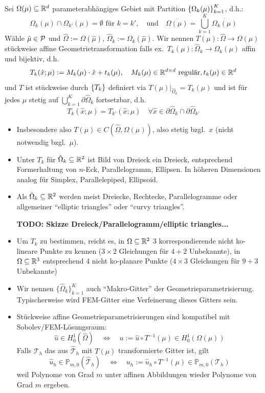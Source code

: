 \begin{defn}
	Sei $\Omega(\mu) \subseteq \mathbb{R}^d$ parameterabhängiges Gebiet mit Partition $\left\{\Omega_k(\mu)\right\}_{k=1}^K$, d.h.:
	\[
		\Omega_k(\mu) \cap \Omega_{k'}(\mu) = \emptyset \text{ für } k = k', \quad \text{und} \quad \overline{\Omega(\mu)} = \bigcup_{k=1}^{K} \overline{\Omega_k(\mu)}
	\]
	Wähle $\hat\mu \in \mathcal{P}$ und $\hat \Omega := \Omega(\hat\mu)$, $\hat\Omega_k := \Omega_k(\hat\mu)$.
	Wir nennen $T(\mu) : \hat\Omega \to \Omega(\mu)$ stückweise affine Geometrietransformation falls ex.\ $T_k(\mu): \hat\Omega_k \to \Omega_k(\mu)$ affin und bijektiv, d.h.
	\[
		T_k(\hat x;\mu) := M_k(\mu) \cdot \hat x + t_k(\mu), \quad M_k(\mu) \in \mathbb{R}^{d \times d} \text{ regulär}, t_k(\mu) \in \mathbb{R}^d
	\]
	und $T$ ist stückweise durch $\left\{T_k\right\}$ definiert via $T(\mu)|_{\hat\Omega_k}=T_k(\mu)$ und ist für jedes $\mu$ stetig auf $\bigcup_{k=1}^K \partial\hat\Omega_k$ fortsetzbar, d.h.
	\[
		T_k(\hat x;\mu) = T_{k'}(\hat x;\mu) \quad \forall \hat x \in \partial\hat\Omega_k \cap \partial\hat\Omega_{k'}
	\]
\end{defn}

\begin{bem} \beginwithlistbem
	\begin{itemize}
		\item Insbesondere also $T(\mu) \in C(\hat\Omega,\Omega(\mu))$, also stetig bzgl.\ $x$ (nicht notwendig bzgl.\ $\mu$).
		\item Unter $T_k$ für $\hat\Omega_k \subseteq \mathbb{R}^2$ ist Bild von Dreieck ein Dreieck, entsprechend Formerhaltung von $n$-Eck, Parallelogramm, Ellipsen.
			In höheren Dimensionen analog für Simplex, Parallelepiped, Ellipsoid.
		\item Als $\hat\Omega_k \subseteq \mathbb{R}^2$ werden meist Dreiecke, Rechtecke, Parallelogramme oder allgemeiner ``elliptic triangles'' oder ``curvy triangles''.

			{\large\bf TODO: Skizze Dreieck/Parallelogramm/elliptic triangles...}
		\item Um $T_k$ zu bestimmen, reicht es, in $\Omega \subseteq \mathbb{R}^2$ 3 korrespondierende nicht ko-lineare Punkte zu kennen ($3 \times 2$ Gleichungen für $4+2$ Unbekannte), in $\Omega \subseteq \mathbb{R}^3$ entsprechend 4 nicht ko-planare Punkte ($4 \times 3$ Gleichungen für $9+3$ Unbekannte)
		\item Wir nennen $\{\hat\Omega_k\}_{k=1}^K$ auch ``Makro-Gitter'' der Geometrieparametrisierung.
			Typischerweise wird FEM-Gitter eine Verfeinerung dieses Gitters sein.
		\item Stückweise affine Geometrieparametrisierungen sind kompatibel mit Sobolev/FEM-Lösungsraum:
			\[
				\hat u \in H_0^1(\hat\Omega) \quad \Leftrightarrow \quad u := \hat u \circ T^{-1}(\mu) \in H_0^1(\Omega(\mu))
			\]
			Falls $\mathcal{T}_h$ das aus $\hat{\mathcal{T}}_h$ mit $T(\mu)$ transformierte Gitter ist, gilt
			\[
				\hat u_h \in \mathbb{P}_{m,0}(\hat{\mathcal{T}}_h) \quad \Leftrightarrow \quad u_h := \hat u_h \circ T^{-1}(\mu) \in \mathbb{P}_{m,0}(\mathcal{T}_h)
			\]
			weil Polynome von Grad $m$ unter affinen Abbildungen wieder Polynome von Grad $m$ ergeben.
	\end{itemize}
\end{bem}

